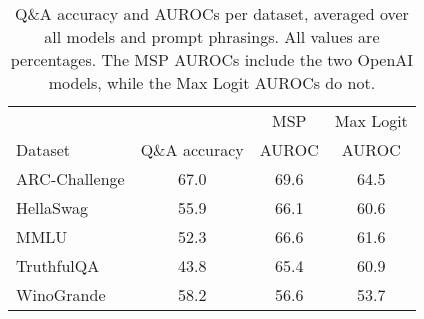\begin{table*}
\small
\centering
\caption{Q\&A accuracy and AUROCs per dataset, averaged over all models and prompt phrasings. All values are percentages. The MSP AUROCs include the two OpenAI models, while the Max Logit AUROCs do not.}
\label{tab:dataset}
\begin{tabular}{lccc}
\toprule
& & MSP & Max Logit\\ 
Dataset & Q\&A accuracy & AUROC & AUROC\\
\cmidrule(lr){1-1} \cmidrule(lr){2-2} \cmidrule(lr){3-3} \cmidrule(lr){4-4}
ARC-Challenge & 67.0 & 69.6 & 64.5\\
HellaSwag & 55.9 & 66.1 & 60.6\\
MMLU & 52.3 & 66.6 & 61.6\\
TruthfulQA & 43.8 & 65.4 & 60.9\\
WinoGrande & 58.2 & 56.6 & 53.7\\
\bottomrule
\end{tabular}
\end{table*}
